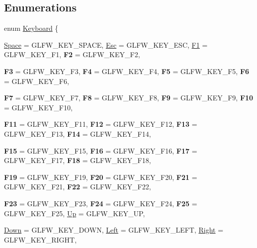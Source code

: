 \subsection*{Enumerations}
\begin{DoxyCompactItemize}
\item 
enum \hyperlink{namespace_f2_c_1_1_keyboard_event_a13172bec547dc5eb2eee6c4fcd64c486}{Keyboard} \{ \par
\hyperlink{namespace_f2_c_1_1_keyboard_event_a13172bec547dc5eb2eee6c4fcd64c486abfbf4c69475e5e85d97f73764fedc78b}{Space} =  GLFW\_\-KEY\_\-SPACE, 
\hyperlink{namespace_f2_c_1_1_keyboard_event_a13172bec547dc5eb2eee6c4fcd64c486ae3b6c619f4caf0910faeb81347700a37}{Esc} =  GLFW\_\-KEY\_\-ESC, 
\hyperlink{namespace_f2_c_1_1_keyboard_event_a13172bec547dc5eb2eee6c4fcd64c486a31aa6109d979898ff66615a1405537dc}{F1} =  GLFW\_\-KEY\_\-F1, 
{\bfseries F2} =  GLFW\_\-KEY\_\-F2, 
\par
{\bfseries F3} =  GLFW\_\-KEY\_\-F3, 
{\bfseries F4} =  GLFW\_\-KEY\_\-F4, 
{\bfseries F5} =  GLFW\_\-KEY\_\-F5, 
{\bfseries F6} =  GLFW\_\-KEY\_\-F6, 
\par
{\bfseries F7} =  GLFW\_\-KEY\_\-F7, 
{\bfseries F8} =  GLFW\_\-KEY\_\-F8, 
{\bfseries F9} =  GLFW\_\-KEY\_\-F9, 
{\bfseries F10} =  GLFW\_\-KEY\_\-F10, 
\par
{\bfseries F11} =  GLFW\_\-KEY\_\-F11, 
{\bfseries F12} =  GLFW\_\-KEY\_\-F12, 
{\bfseries F13} =  GLFW\_\-KEY\_\-F13, 
{\bfseries F14} =  GLFW\_\-KEY\_\-F14, 
\par
{\bfseries F15} =  GLFW\_\-KEY\_\-F15, 
{\bfseries F16} =  GLFW\_\-KEY\_\-F16, 
{\bfseries F17} =  GLFW\_\-KEY\_\-F17, 
{\bfseries F18} =  GLFW\_\-KEY\_\-F18, 
\par
{\bfseries F19} =  GLFW\_\-KEY\_\-F19, 
{\bfseries F20} =  GLFW\_\-KEY\_\-F20, 
{\bfseries F21} =  GLFW\_\-KEY\_\-F21, 
{\bfseries F22} =  GLFW\_\-KEY\_\-F22, 
\par
{\bfseries F23} =  GLFW\_\-KEY\_\-F23, 
{\bfseries F24} =  GLFW\_\-KEY\_\-F24, 
{\bfseries F25} =  GLFW\_\-KEY\_\-F25, 
\hyperlink{namespace_f2_c_1_1_keyboard_event_a13172bec547dc5eb2eee6c4fcd64c486ac98c514d729af1c9d90852cf3c578675}{Up} =  GLFW\_\-KEY\_\-UP, 
\par
\hyperlink{namespace_f2_c_1_1_keyboard_event_a13172bec547dc5eb2eee6c4fcd64c486a60142dd3edb60e35aa30dfbd448415ac}{Down} =  GLFW\_\-KEY\_\-DOWN, 
\hyperlink{namespace_f2_c_1_1_keyboard_event_a13172bec547dc5eb2eee6c4fcd64c486ab083c5eb1cdc062d8c2db64bf2322a5f}{Left} =  GLFW\_\-KEY\_\-LEFT, 
\hyperlink{namespace_f2_c_1_1_keyboard_event_a13172bec547dc5eb2eee6c4fcd64c486abf00b77cb9fe5b6d3d19e8edad1de4c1}{Right} =  GLFW\_\-KEY\_\-RIGHT, 

\end{DoxyCompactItemize}

